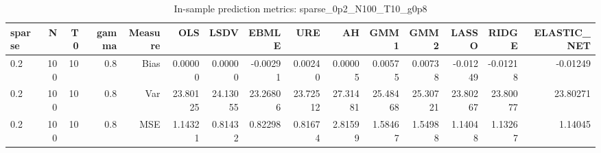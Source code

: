 \begin{table}[!htbp]\centering
\caption{In-sample prediction metrics: sparse_0p2_N100_T10_g0p8}
\label{tab:table2_sparse_0p2_N100_T10_g0p8}
\begin{tabular}{lrrrrrrrrrrrrrr}
\hline
sparse & N & T0 & gamma & Measure & OLS & LSDV & EBMLE & URE & AH & GMM1 & GMM2 & LASSO & RIDGE & ELASTIC_NET \\
\hline
0.2 & 100 & 10 & 0.8 & Bias & 0.00000 & 0.00000 & -0.00291 & 0.00240 & 0.00005 & 0.00575 & 0.00738 & -0.01249 & -0.01218 & -0.01249 \\
0.2 & 100 & 10 & 0.8 & Var & 23.80125 & 24.13055 & 23.26806 & 23.72512 & 27.31481 & 25.48468 & 25.30721 & 23.80267 & 23.80077 & 23.80271 \\
0.2 & 100 & 10 & 0.8 & MSE & 1.14321 & 0.81432 & 0.82298 & 0.81674 & 2.81599 & 1.58467 & 1.54988 & 1.14048 & 1.13267 & 1.14045 \\
\hline
\end{tabular}
\end{table}

